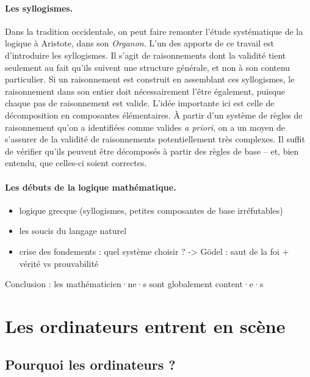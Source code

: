 \paragraph{Les syllogismes.}
Dans la tradition occidentale, on peut faire remonter l’étude systématique de
la logique à Aristote, dans son \textit{Organon}.
L’un des apports de ce travail est d’introduire les syllogismes.
Il s’agit de raisonnements dont la validité tient seulement au fait qu’ils
suivent une structure générale, et non à son contenu particulier.
Si un raisonnement est construit en assemblant ces syllogismes,
le raisonnement dans son entier doit nécessairement l’être également, puisque
chaque pas de raisonnement est valide.
L’idée importante ici est celle de décomposition en composantes élémentaires. À
partir d’un système de règles de raisonnement qu’on a identifiées comme valides 
\textit{a priori},
on a un moyen de s’assurer de la validité de raisonnements potentiellement
très complexes.
Il suffit de vérifier qu’ils peuvent être décomposés à partir
des règles de base – et, bien entendu, que celles-ci soient correctes.

\paragraph{Les débuts de la logique mathématique.}


\begin{itemize}
  \item logique grecque (syllogismes, petites composantes de base irréfutables)
  \item les soucis du langage naturel
  \item crise des fondements : quel système choisir ? -> Gödel : saut de la foi + vérité vs prouvabilité
\end{itemize}
Conclusion : les mathématicien·ne·s sont globalement content·e·s

\section{Les ordinateurs entrent en scène}
\label{sec:assistants-preuve}

\subsection{Pourquoi les ordinateurs ?}

